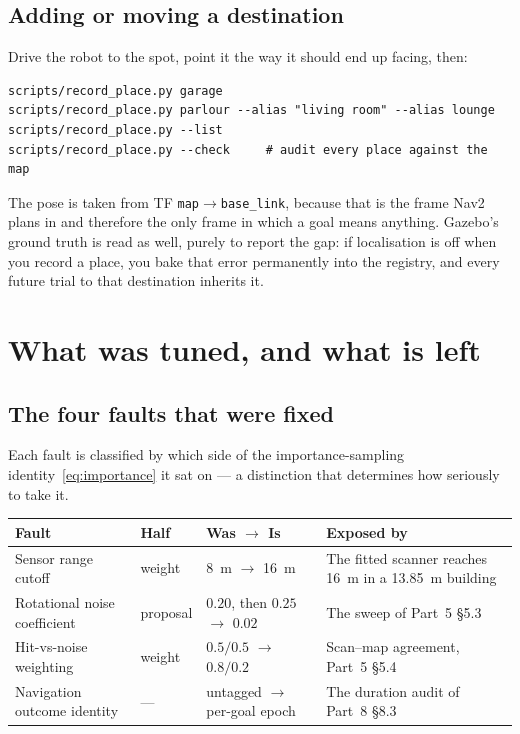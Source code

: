 \documentclass[11pt,a4paper]{report}
\newcommand{\file}[1]{\texttt{\small #1}}
\begin{document}
\section{Adding or moving a destination}

\begin{plain}
Drive the robot to the spot, point it the way it should end up facing, then:
\begin{verbatim}
scripts/record_place.py garage
scripts/record_place.py parlour --alias "living room" --alias lounge
scripts/record_place.py --list
scripts/record_place.py --check     # audit every place against the map
\end{verbatim}
The pose is taken from TF \file{map}$\rightarrow$\file{base\_link}, because
that is the frame Nav2 plans in and therefore the only frame in which a goal
means anything. Gazebo's ground truth is read as well, purely to report the
gap: if localisation is off when you record a place, you bake that error
permanently into the registry, and every future trial to that destination
inherits it.
\end{plain}

\chapter{What was tuned, and what is left}
\label{ch:tuning}

\section{The four faults that were fixed}

Each fault is classified by which side of the importance-sampling
identity~\eqref{eq:importance} it sat on --- a distinction that determines how
seriously to take it.

\begin{center}
\small
\begin{tabular}{@{}p{}p{}p{}p{}@{}}
\toprule
\textbf{Fault} & \textbf{Half} & \textbf{Was} $\rightarrow$ \textbf{Is} & \textbf{Exposed by} \\
\midrule
Sensor range cutoff & weight &
  \SI{8}{\metre} $\rightarrow$ \SI{16}{\metre} &
  The fitted scanner reaches \SI{16}{\metre} in a \SI{13.85}{\metre} building \\
Rotational noise coefficient & proposal &
  $0.20$, then $0.25$ $\rightarrow$ $0.02$ &
  The sweep of Part~5 \S5.3 \\
Hit-vs-noise weighting & weight &
  $0.5/0.5$ $\rightarrow$ $0.8/0.2$ &
  Scan--map agreement, Part~5 \S5.4 \\
Navigation outcome identity & --- &
  untagged $\rightarrow$ per-goal epoch &
  The duration audit of Part~8 \S8.3 \\
\bottomrule
\end{tabular}
\end{center}
\end{document}
